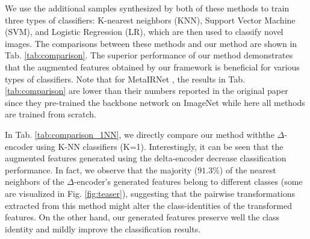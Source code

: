 \documentclass[10pt,twocolumn,letterpaper]{article}
\begin{document}
  
We use the additional samples synthesized by both of these methods to train three types of classifiers:
  K-nearest neighbors (KNN), Support Vector Machine (SVM), and Logistic Regression (LR), which are then used to classify novel images. The comparisons between these methods and our method are shown in Tab. \ref{tab:comparison}.
The superior performance of our method demonstrates that the augmented features obtained by our framework is beneficial for various types of classifiers.
Note that for MetaIRNet \cite{metair_gan}, the results in Tab. \ref{tab:comparison} are lower than their numbers reported in the original paper since they pre-trained the backbone network on ImageNet while here all methods are trained from scratch. 
   \begin{table}[!h] 
    \centering

    \caption{\textbf{Analysis of different classifiers.} Few-shot classification accuracy on the CUB ~\cite{cub} dataset in 1-shot and 5-shot settings with different types of classifiers.
}
    \label{tab:comparison}\end{table}
  
  In Tab. \ref{tab:comparison_1NN}, we directly compare our method withthe  $\Delta$-encoder using K-NN classifiers (K=1). Interestingly, it can be seen that the augmented features generated using the delta-encoder decrease classification performance. In fact, we observe that the majority ($91.3\%$) of the nearest neighbors of the $\Delta$-encoder's generated features belong to different classes (some are visualized in Fig. \ref{fig:teaser}), suggesting that the pairwise transformations extracted from this method might alter the class-identities of the transformed features. On the other hand, our generated features preserve well the class identity and mildly improve the classification results.
  
\end{document}
